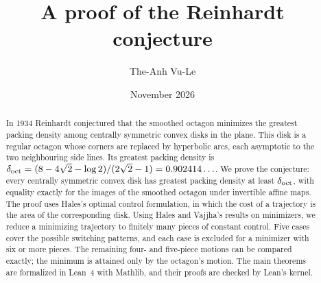 \documentclass[11pt,reqno]{amsart}
\title{A proof of the Reinhardt conjecture}
\author{The-Anh Vu-Le}
\date{November 2026}
\theoremstyle{plain}
\theoremstyle{definition}
\theoremstyle{remark}
\numberwithin{equation}{section}
\begin{document}
\begin{abstract}
  In 1934 Reinhardt conjectured that the smoothed octagon minimizes the greatest packing density
  among centrally symmetric convex disks in the plane. This disk is a regular octagon whose
  corners are replaced by hyperbolic arcs, each asymptotic to the two neighbouring side lines. Its greatest
  packing density is $\delta_{\mathrm{oct}}=(8-4\sqrt2-\log2)/(2\sqrt2-1)=0.902414\ldots$. We prove the
  conjecture: every centrally symmetric convex disk has greatest packing density at least $\delta_{\mathrm{oct}}$,
  with equality exactly for the images of the smoothed octagon under invertible affine maps. The
  proof uses Hales's optimal control formulation, in which the cost of a trajectory is the area of
  the corresponding disk. Using Hales and Vajjha's results on minimizers, we reduce a minimizing
  trajectory to finitely many pieces of constant control. Five cases cover the possible switching
  patterns, and each case is excluded for a minimizer with six or more pieces. The remaining four-
  and five-piece motions can be compared exactly; the minimum is attained only by the octagon's
  motion. The main theorems are formalized in Lean~4 with Mathlib, and their proofs are checked by
  Lean's kernel.
\end{abstract}

\maketitle

\clearpage
\setcounter{tocdepth}{2}
{\small\tableofcontents}
\clearpage







\clearpage
\appendix
{}


\clearpage

\clearpage

\clearpage

\clearpage

\clearpage

\clearpage


\clearpage

\clearpage

\clearpage






\end{document}
